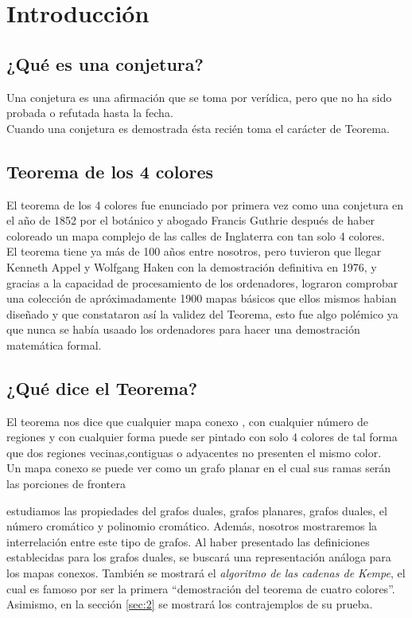 \documentclass[3p,times,a4paper,twocolumn,authoryear]{elsarticle} %
\begin{document}
\tableofcontents

\section{Introducción}\label{sec:1}

\subsection{¿Qué es una conjetura?}
Una conjetura es una afirmación que se toma por verídica, pero que no ha sido probada o refutada hasta la fecha.\\
Cuando una conjetura es demostrada ésta recién toma el carácter de Teorema.

\subsection{Teorema de  los 4 colores}
El teorema de los 4 colores fue enunciado por primera vez como una conjetura en el año de 1852 por el botánico y abogado Francis Guthrie después de haber coloreado un mapa complejo de las calles de Inglaterra con tan solo 4 colores.\\

\noindent El teorema tiene ya más de 100 años entre nosotros, pero tuvieron que llegar Kenneth Appel y Wolfgang Haken con la demostración definitiva en 1976, y gracias a la capacidad de procesamiento de los ordenadores, lograron comprobar una colección de apróximadamente 1900 mapas básicos que ellos mismos habian diseñado y que constataron así la validez del Teorema, esto fue algo polémico ya que nunca se había usaado los ordenadores para hacer una demostración matemática formal.


\subsection{¿Qué dice el Teorema?}
El teorema nos dice que cualquier mapa conexo , con cualquier número de regiones y con cualquier forma puede ser pintado con solo 4 colores de tal forma que dos regiones vecinas,contiguas o adyacentes no presenten el mismo color.\\
Un mapa conexo se puede ver como un grafo planar en el cual sus ramas serán las porciones de frontera

estudiamos las propiedades del grafos duales, grafos planares, grafos duales, el número cromático y polinomio cromático. Además, nosotros mostraremos la interrelación entre este tipo de grafos. Al haber presentado las definiciones establecidas para los grafos duales, se buscará una representación análoga para los mapas conexos. También se mostrará el \emph{algoritmo de las cadenas de Kempe}, el cual es famoso por ser la primera ``demostración del teorema de cuatro colores''. Asimismo, en la sección \ref{sec:2} se mostrará los contrajemplos de su prueba.
\end{document}
